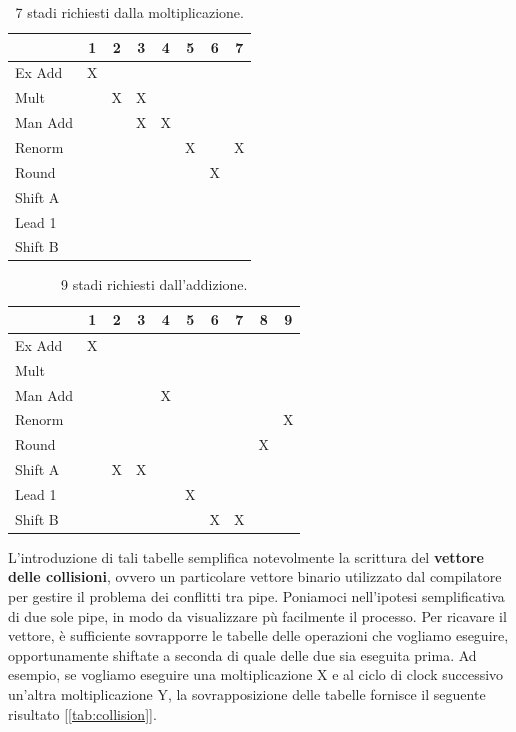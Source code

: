 \begin{table}[!h]
\centering
\begin{tabular}{|l|c|c|c|c|c|c|c|}
\hline
         & 1 & 2 & 3 & 4 & 5 & 6 & 7 \\
\hline
Ex Add   & X &   &   &   &   &   &   \\
\hline
Mult     &   & X & X &   &   &   &   \\
\hline
Man Add  &   &   & X & X &   &   &   \\
\hline
Renorm   &   &   &   &   & X &   & X \\
\hline
Round    &   &   &   &   &   & X &   \\
\hline
Shift A  &   &   &   &   &   &   &   \\
\hline
Lead 1   &   &   &   &   &   &   &   \\
\hline
Shift B  &   &   &   &   &   &   &   \\
\hline
\end{tabular}
\caption{7 stadi richiesti dalla moltiplicazione.}
\label{tab:mul}
\end{table}

\begin{table}[!h]
\centering
\begin{tabular}{|l|c|c|c|c|c|c|c|c|c|}
\hline
         & 1 & 2 & 3 & 4 & 5 & 6 & 7 & 8 & 9 \\
\hline
Ex Add   & X &   &   &   &   &   &   &   &   \\
\hline
Mult     &   &   &   &   &   &   &   &   &   \\
\hline
Man Add  &   &   &   & X &   &   &   &   &   \\
\hline
Renorm   &   &   &   &   &   &   &   &   & X \\
\hline
Round    &   &   &   &   &   &   &   & X &   \\
\hline
Shift A  &   & X & X &   &   &   &   &   &   \\
\hline
Lead 1   &   &   &   &   & X &   &   &   &   \\
\hline
Shift B  &   &   &   &   &   & X & X &   &   \\
\hline
\end{tabular}
\caption{9 stadi richiesti dall'addizione.}
\label{tab:add}
\end{table}

L'introduzione di tali tabelle semplifica notevolmente la scrittura del \textbf{vettore delle collisioni}, ovvero un particolare vettore binario utilizzato dal compilatore per gestire il problema dei conflitti tra pipe. Poniamoci nell'ipotesi semplificativa di due sole pipe, in modo da visualizzare pù facilmente il processo. Per ricavare il vettore, è sufficiente sovrapporre le tabelle delle operazioni che vogliamo eseguire, opportunamente shiftate a seconda di quale delle due sia eseguita prima. Ad esempio, se vogliamo eseguire una moltiplicazione X e al ciclo di clock successivo un'altra moltiplicazione Y, la sovrapposizione delle tabelle fornisce il seguente risultato [\ref{tab:collision}].

